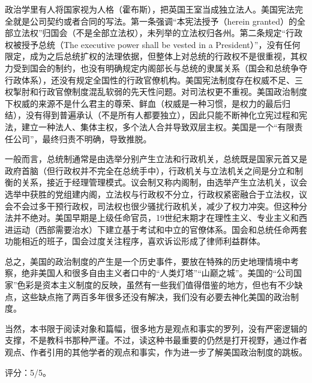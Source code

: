 \begin{itemize*}
    \item 政治学里有人将国家视为人格（霍布斯），把英国王室当成独立法人。美国宪法完全就是公司契约或者合同的写法。第一条强调“本宪法授予（herein granted）的全部立法权”归国会（不是全部立法权），未列举的立法权归各州。第二条规定“行政权被授予总统（The executive power shall be vested in a President）”，没有任何限定，成为之后总统扩权的法理依据，但整体上对总统的行政权不是很重视，其权力受到国会的制约，也没有明确规定内阁部长与总统的隶属关系（国会和总统争夺行政体系），还没有规定全国性的行政官僚机构。美国宪法制度存在权威不足、三权掣肘和行政官僚制度混乱软弱的先天性问题。对司法权更不重视。美国政治制度下权威的来源不是什么君主的尊荣、鲜血（权威是一种习惯，是权力的最后归结），没有得到普遍承认（不是所有人都要独立），因此只能不断神化立宪过程和宪法，建立一种法人、集体主权，多个法人合并导致双层主权。美国是一个“有限责任公司”，最终归责不明确，导致推脱。
    \item 一般而言，总统制通常是由选举分别产生立法和行政机关，总统既是国家元首又是政府首脑（但行政权并不完全在总统手中），行政机关与立法机关之间是分立和制衡的关系，接近于经理管理模式。议会制又称内阁制，由选举产生立法机关，议会选举中获胜的党组建内阁，立法权与行政权不分立，行政权紧密融合于立法权，议会不会过多干预行政权，司法权也很少骚扰行政机关，减少了权力冲突。但这种分法并不绝对。美国早期是上级任命官员，19世纪末期才在理性主义、专业主义和西进运动（西部需要治水）下建立基于考试和中立的官僚体系。国会和总统任命两套功能相近的班子，国会过度关注程序，喜欢诉讼形成了律师利益群体。
\end{itemize*}

总之，美国的政治制度的产生是一个历史事件，要放在特殊的历史地理情境中考察，绝非美国人和很多自由主义者口中的“人类灯塔”“山巅之城”。美国的“公司国家”色彩是资本主义制度的反映，虽然有一些我们值得借鉴的地方，但也有不少缺点，这些缺点拖了两百多年很多还没有解决，我们没有必要去神化美国的政治制度。

当然，本书限于阅读对象和篇幅，很多地方是观点和事实的罗列，没有严密逻辑的支撑，不是教科书那种严谨。不过，读这种书最重要的仍然是打开视野，通过作者观点、作者引用的其他学者的观点和事实，作为进一步了解美国政治制度的跳板。

评分：5/5。